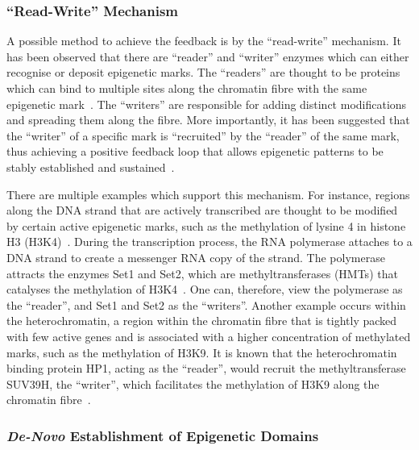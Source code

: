 \documentclass[12pt]{article}
\begin{document}
\subsubsection{``Read-Write'' Mechanism}
\label{sec:read-write}
A possible method to achieve the feedback is by the ``read-write'' mechanism. It has been observed that there are ``reader'' and ``writer'' enzymes which can either recognise or deposit epigenetic marks. The ``readers'' are thought to be proteins which can bind to multiple sites along the chromatin fibre with the same epigenetic mark~\cite{brackley2013}. The ``writers'' are responsible for adding distinct modifications and spreading them along the fibre. More importantly, it has been suggested that the ``writer'' of a specific mark is ``recruited'' by the ``reader'' of the same mark, thus achieving a positive feedback loop that allows epigenetic patterns to be stably established and sustained~\cite{dodd2007, hathaway2012}. 

There are multiple examples which support this mechanism. For instance, regions along the DNA strand that are actively transcribed are thought to be modified by certain active epigenetic marks, such as the methylation of lysine 4 in histone H3 (H3K4)~\cite{zentner2013}. During the transcription process, the RNA polymerase attaches to a DNA strand to create a messenger RNA copy of the strand. The polymerase attracts the enzymes Set1 and Set2, which are methyltransferases (HMTs) that catalyses the methylation of H3K4~\cite{zentner2013, ruthenburgh2007}. One can, therefore, view the polymerase as the ``reader'', and Set1 and Set2 as the ``writers''. Another example occurs within the heterochromatin, a region within the chromatin fibre that is tightly packed with few active genes and is associated with a higher concentration of methylated marks, such as the methylation of H3K9. It is known that the heterochromatin binding protein HP1, acting as the ``reader'', would recruit the methyltransferase SUV39H, the ``writer'', which facilitates the methylation of H3K9 along the chromatin fibre~\cite{zentner2013}.

\subsubsection{\emph{De-Novo} Establishment of Epigenetic Domains}
\label{sec:bookmark}
\end{document}
